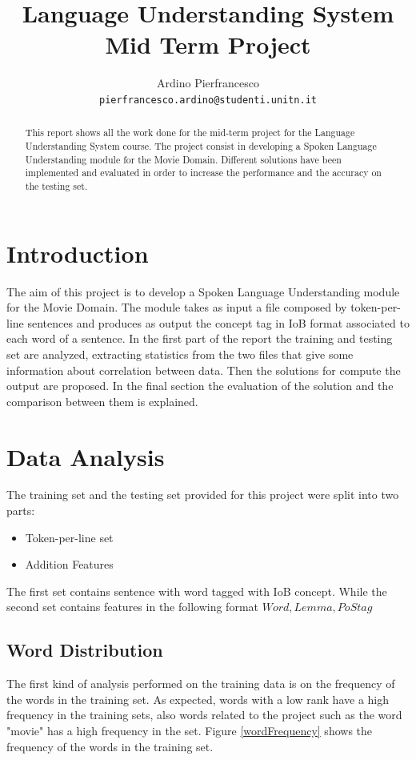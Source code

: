 \documentclass[11pt,a4paper]{article}
\title{Language Understanding System Mid Term Project}
\author{Ardino Pierfrancesco \\
  {\tt pierfrancesco.ardino@studenti.unitn.it}}
\date{}
\begin{document}
\maketitle
\begin{abstract}
    This report shows all the work done for the mid-term project for the Language Understanding System course. The project consist in developing a Spoken Language Understanding module for the Movie Domain. Different solutions have been implemented and evaluated in order to increase the performance and the accuracy on the testing set.
\end{abstract}
\section{Introduction}

The aim of this project is to develop a Spoken Language Understanding module for the Movie Domain.
The module takes as input a file composed by token-per-line sentences and produces as output the concept tag in IoB format associated to each word of a sentence. In the first part of the report the training and testing set are analyzed, extracting statistics from the two files that give some information about correlation between data. Then the solutions for compute the output are proposed. In the final section the evaluation of the solution and the comparison between them is explained.
\section{Data Analysis}
The training set and the testing set provided for this project were split into two parts:
\begin{itemize}
    \item Token-per-line set
    \item Addition Features
\end{itemize}
The first set contains sentence with word tagged with IoB concept. While the second set contains features in the following format \(Word, Lemma, PoS tag \)

\subsection{Word Distribution}
    The first kind of analysis performed on the training data is on the frequency of the words in the training set. As expected, words with a low rank have a high frequency in the training sets, also words related to the project such as the word "movie" has a high frequency in the set. Figure \ref{wordFrequency} shows the frequency of the words in the training set.
\end{document}
